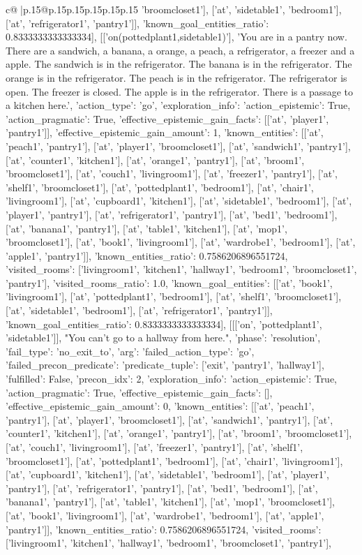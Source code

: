 \documentclass{article}
\begin{document}
{\begin{supertabular}{c@{$\;$}|p{.15\linewidth}@{}p{.15\linewidth}p{.15\linewidth}p{.15\linewidth}p{.15\linewidth}p{.15\linewidth}}
{{{'broomcloset1'], ['at', 'sidetable1', 'bedroom1'], ['at', 'refrigerator1', 'pantry1']], 'known_goal_entities_ratio': 0.8333333333333334}}], [['on(pottedplant1,sidetable1)'], 'You are in a pantry now. There are a sandwich, a banana, a orange, a peach, a refrigerator, a freezer and a apple. The sandwich is in the refrigerator. The banana is in the refrigerator. The orange is in the refrigerator. The peach is in the refrigerator. The refrigerator is open. The freezer is closed. The apple is in the refrigerator. There is a passage to a kitchen here.', {'action_type': 'go', 'exploration_info': {'action_epistemic': True, 'action_pragmatic': True, 'effective_epistemic_gain_facts': [['at', 'player1', 'pantry1']], 'effective_epistemic_gain_amount': 1, 'known_entities': [['at', 'peach1', 'pantry1'], ['at', 'player1', 'broomcloset1'], ['at', 'sandwich1', 'pantry1'], ['at', 'counter1', 'kitchen1'], ['at', 'orange1', 'pantry1'], ['at', 'broom1', 'broomcloset1'], ['at', 'couch1', 'livingroom1'], ['at', 'freezer1', 'pantry1'], ['at', 'shelf1', 'broomcloset1'], ['at', 'pottedplant1', 'bedroom1'], ['at', 'chair1', 'livingroom1'], ['at', 'cupboard1', 'kitchen1'], ['at', 'sidetable1', 'bedroom1'], ['at', 'player1', 'pantry1'], ['at', 'refrigerator1', 'pantry1'], ['at', 'bed1', 'bedroom1'], ['at', 'banana1', 'pantry1'], ['at', 'table1', 'kitchen1'], ['at', 'mop1', 'broomcloset1'], ['at', 'book1', 'livingroom1'], ['at', 'wardrobe1', 'bedroom1'], ['at', 'apple1', 'pantry1']], 'known_entities_ratio': 0.7586206896551724, 'visited_rooms': ['livingroom1', 'kitchen1', 'hallway1', 'bedroom1', 'broomcloset1', 'pantry1'], 'visited_rooms_ratio': 1.0, 'known_goal_entities': [['at', 'book1', 'livingroom1'], ['at', 'pottedplant1', 'bedroom1'], ['at', 'shelf1', 'broomcloset1'], ['at', 'sidetable1', 'bedroom1'], ['at', 'refrigerator1', 'pantry1']], 'known_goal_entities_ratio': 0.8333333333333334}}], [[['on', 'pottedplant1', 'sidetable1']], "You can't go to a hallway from here.", {'phase': 'resolution', 'fail_type': 'no_exit_to', 'arg': {'failed_action_type': 'go', 'failed_precon_predicate': {'predicate_tuple': ['exit', 'pantry1', 'hallway1'], 'fulfilled': False, 'precon_idx': 2}}, 'exploration_info': {'action_epistemic': True, 'action_pragmatic': True, 'effective_epistemic_gain_facts': [], 'effective_epistemic_gain_amount': 0, 'known_entities': [['at', 'peach1', 'pantry1'], ['at', 'player1', 'broomcloset1'], ['at', 'sandwich1', 'pantry1'], ['at', 'counter1', 'kitchen1'], ['at', 'orange1', 'pantry1'], ['at', 'broom1', 'broomcloset1'], ['at', 'couch1', 'livingroom1'], ['at', 'freezer1', 'pantry1'], ['at', 'shelf1', 'broomcloset1'], ['at', 'pottedplant1', 'bedroom1'], ['at', 'chair1', 'livingroom1'], ['at', 'cupboard1', 'kitchen1'], ['at', 'sidetable1', 'bedroom1'], ['at', 'player1', 'pantry1'], ['at', 'refrigerator1', 'pantry1'], ['at', 'bed1', 'bedroom1'], ['at', 'banana1', 'pantry1'], ['at', 'table1', 'kitchen1'], ['at', 'mop1', 'broomcloset1'], ['at', 'book1', 'livingroom1'], ['at', 'wardrobe1', 'bedroom1'], ['at', 'apple1', 'pantry1']], 'known_entities_ratio': 0.7586206896551724, 'visited_rooms': ['livingroom1', 'kitchen1', 'hallway1', 'bedroom1', 'broomcloset1', 'pantry1'], }}}
\end{supertabular}}
\end{document}
